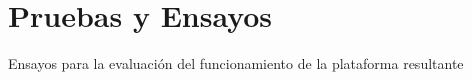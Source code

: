 \section{Pruebas y Ensayos} \label{ensayos}
\thispagestyle{plain}

\vspace{0.5cm}

\Large\scshape
\begin{center}
    \textrm{Ensayos para la evaluación del funcionamiento de la plataforma resultante}
\end{center}
\normalfont

\divider

\lipsum[1]\\

\afterpage{\blankpage}\newpage